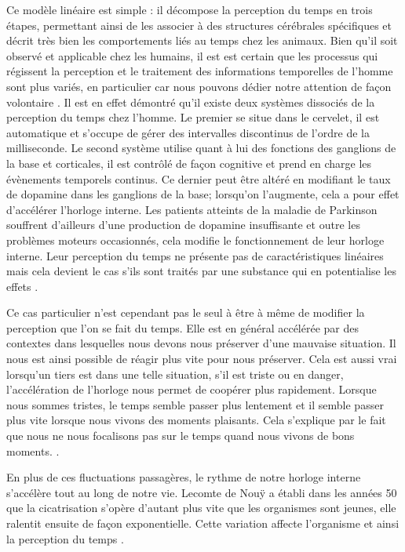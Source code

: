 \documentclass[12pt,fleqn,oneside,french,openany]{book} %
\begin{document}
Ce modèle linéaire est simple : il décompose la perception du temps en trois étapes, permettant ainsi de les associer à des structures cérébrales spécifiques et décrit très bien les comportements liés au temps chez les animaux. Bien qu'il soit observé et applicable chez les humains, il est est certain que les processus qui régissent la perception et le traitement des informations temporelles de l'homme sont plus variés, en particulier car nous pouvons dédier notre attention de façon volontaire \cite{set}. Il est en effet démontré qu'il existe deux systèmes dissociés de la perception du temps chez l'homme. Le premier se situe dans le cervelet, il est automatique et s'occupe de gérer des intervalles discontinus de l'ordre de la milliseconde. Le second système utilise quant à lui des fonctions des ganglions de la base et corticales, il est contrôlé de façon cognitive et prend en charge les évènements temporels continus. Ce dernier peut être altéré en modifiant le taux de dopamine dans les ganglions de la base; lorsqu'on l'augmente, cela a pour effet d'accélérer l'horloge interne. Les patients atteints de la maladie de Parkinson souffrent d'ailleurs d'une production de dopamine insuffisante et outre les problèmes moteurs occasionnés, cela modifie le fonctionnement de leur horloge interne. Leur perception du temps ne présente pas de caractéristiques linéaires mais cela devient le cas s'ils sont traités par une substance qui en potentialise les effets \cite{buhusi2005}.

Ce cas particulier n'est cependant pas le seul à être à même de modifier la perception que l'on se fait du temps. Elle est en général accélérée par des contextes dans lesquelles nous devons nous préserver d'une mauvaise situation. Il nous est ainsi possible de réagir plus vite pour nous préserver. Cela est aussi vrai lorsqu'un tiers est dans une telle situation, s'il est triste ou en danger, l'accélération de l'horloge nous permet de coopérer plus rapidement. Lorsque nous sommes tristes, le temps semble passer plus lentement et il semble passer plus vite lorsque nous vivons des moments plaisants. Cela s'explique par le fait que nous ne nous focalisons pas sur le temps quand nous vivons de bons moments. \cite{emotionsTemps,emotionsTemps2}.

En plus de ces fluctuations passagères, le rythme de notre horloge interne s'accélère tout au long de notre vie. Lecomte de Nouÿ a établi dans les années 50 que la cicatrisation s'opère d'autant plus vite que les organismes sont jeunes, elle ralentit ensuite de façon exponentielle. Cette variation affecte l'organisme et ainsi la perception du temps \cite{quesaije}.
\end{document}
